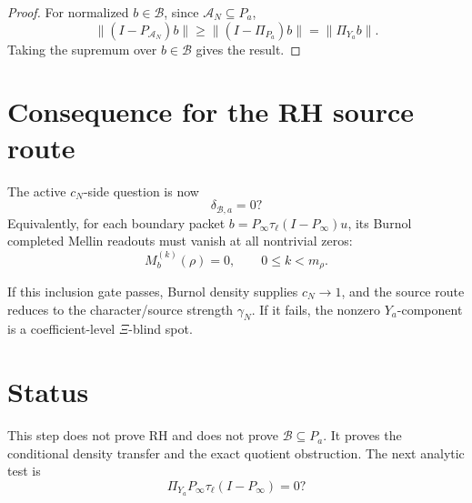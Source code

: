 \documentclass[11pt]{article}
\newcommand{\B}{\mathcal B}
\newcommand{\A}{\mathcal A}
\begin{document}
\begin{proof}
For normalized \(b\in\B\), since \(\A_N\subseteq P_a\),
\[
  \|(I-P_{\A_N})b\|\ge \|(I-\Pi_{P_a})b\|=\|\Pi_{Y_a}b\|.
\]
Taking the supremum over \(b\in\B\) gives the result.
\end{proof}

\section{Consequence for the RH source route}
The active \(c_N\)-side question is now
\[
  \boxed{\delta_{\B,a}=0?}
\]
Equivalently, for each boundary packet \(b=P_\infty\tau_\ell(I-P_\infty)u\), its Burnol completed Mellin readouts must vanish at all nontrivial zeros:
\[
  M_b^{(k)}(\rho)=0,
  \qquad 0\le k<m_\rho.
\]

If this inclusion gate passes, Burnol density supplies \(c_N\to1\), and the source route reduces to the character/source strength \(\gamma_N\). If it fails, the nonzero \(Y_a\)-component is a coefficient-level \(\Xi\)-blind spot.

\section{Status}
This step does not prove RH and does not prove \(\B\subseteq P_a\).  It proves the conditional density transfer and the exact quotient obstruction.  The next analytic test is
\[
  \Pi_{Y_a}P_\infty\tau_\ell(I-P_\infty)=0?
\]
\end{document}
